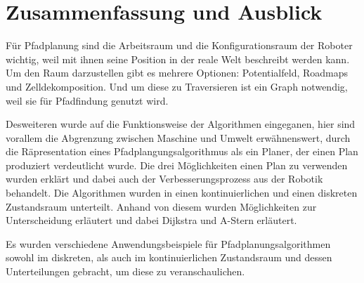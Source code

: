 
\chapter{Zusammenfassung und Ausblick}

Für Pfadplanung sind die Arbeitsraum und die Konfigurationsraum der Roboter wichtig, weil mit ihnen seine Position in der reale Welt beschreibt werden kann. Um den Raum darzustellen gibt es mehrere Optionen: Potentialfeld, Roadmaps und Zelldekomposition. Und um diese zu Traversieren ist ein Graph notwendig, weil sie für Pfadfindung genutzt wird.

Desweiteren wurde auf die Funktionsweise der Algorithmen eingeganen, hier sind vorallem die Abgrenzung zwischen Maschine und Umwelt erwähnenswert, durch die Räpresentation eines Pfadplangungsalgorithmus als ein Planer, der einen Plan produziert verdeutlicht wurde. Die drei Möglichkeiten einen Plan zu verwenden wurden erklärt und dabei auch der Verbesserungsprozess aus der Robotik behandelt. Die Algorithmen wurden in einen kontinuierlichen und einen diskreten Zustandsraum unterteilt. Anhand von diesem wurden Möglichkeiten zur Unterscheidung erläutert und dabei Dijkstra und A-Stern erläutert. 

Es wurden verschiedene Anwendungsbeispiele für Pfadplanungsalgorithmen sowohl im diskreten, als auch im kontinuierlichen Zustandsraum und dessen Unterteilungen gebracht, um diese zu veranschaulichen.
